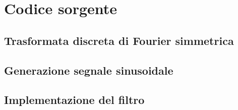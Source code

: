


\chapter{Codice sorgente}
\label{Appendix2}


\section{Trasformata discreta di Fourier simmetrica}



\section{Generazione segnale sinusoidale}


\section{Implementazione del filtro}
\label{appB:filtring}

    
